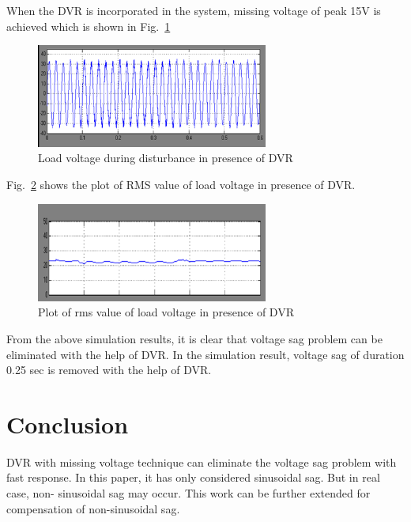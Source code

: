 \documentclass[journal,twoside]{IEEEtran}
\begin{document}
When the DVR is incorporated in the system, missing
voltage of peak 15V is achieved which is shown in Fig.~\ref{f7}
\begin{figure}[!ht]
\centering
\includegraphics[width=3in]{7}
\caption{Load voltage during disturbance in presence of DVR}
\label{f7}
\end{figure}
Fig.~\ref{f8} shows the plot of RMS value of load voltage in
presence of DVR.

\begin{figure}[!ht]
\centering
\includegraphics[width=3in]{8}
\caption{Plot of rms value of load voltage in presence of DVR}
\label{f8}
\end{figure}


From the above simulation results, it is clear that voltage
sag problem can be eliminated with the help of DVR. In
the simulation result, voltage sag of duration 0.25 sec is
removed with the help of DVR.

	\section{Conclusion}

DVR with missing voltage technique can eliminate the
voltage sag problem with fast response. In this paper, it
has only considered sinusoidal sag. But in real case, non-
sinusoidal sag may occur. This work can be further extended
for compensation of non-sinusoidal sag.
\end{document}
